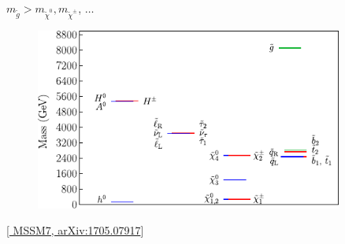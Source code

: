 \documentclass[10pt,aspectratio=169]{beamer}
\begin{document}
\begin{frame}
\begin{columns}[t]
\begin{column}{0.5\textwidth}
\begin{itemize}
        $m_{\tilde{g}} > m_{\tilde{\chi}^0}, m_{\tilde{\chi}^\pm}$, $\ldots$
      \end{itemize}
      \begin{figure}
        \centering
        \includegraphics[width=0.9\textwidth]{gambit_mssm7_best_fit}
      \end{figure}
      \vspace*{-25pt}
      \begin{center}
        { \tiny [\href{http://arxiv.org/abs/1705.07917}{%
              MSSM7, arXiv:1705.07917}] }
      \end{center}
    \end{column}
  \end{columns}
\end{frame}
\end{document}
